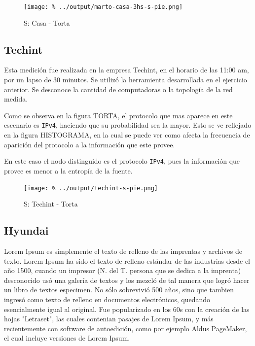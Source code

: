 \documentclass[final,narroweqnarray,inline]{ieee}
\begin{document}
  \begin{figure}[h]\begin{center}
    \texttt{[image: \%
    ../output/marto-casa-3hs-s-pie.png]}
    \vspace{-3em}
    \caption{S: Casa - Torta}
    \label{marto-casa-3hs-s-pie}
  \end{center}\end{figure}

  \subsection{Techint}

  Esta medición fue realizada en la empresa Techint, en el horario de
  las 11:00 am, por un lapso de 30 minutos. Se utilizó la herramienta
  desarrollada en el ejercicio anterior. Se desconoce la cantidad de
  computadoras o la topología de la red medida.
  
  Como se observa en la figura TORTA, el protocolo que mas aparece en
  este escenario es \texttt{IPv4}, haciendo que su probabilidad sea la
  mayor. Esto se ve reflejado en la figura HISTOGRAMA, en la cual se
  puede ver como afecta la frecuencia de aparición del protocolo a la
  información que este provee.

  En este caso el nodo distinguido es el protocolo \texttt{IPv4}, pues
  la información que provee es menor a la entropía de la fuente.

  \begin{figure}[ht]\begin{center}
    \texttt{[image: \%
    ../output/techint-s-pie.png]}
    \vspace{-3em}
    \caption{S: Techint - Torta}
    \label{techint-s-pie}
  \end{center}\end{figure}

  \subsection{Hyundai}

Lorem Ipsum es simplemente el texto de relleno de las imprentas y archivos de texto. Lorem Ipsum ha sido el texto de relleno estándar de las industrias desde el año 1500, cuando un impresor (N. del T. persona que se dedica a la imprenta) desconocido usó una galería de textos y los mezcló de tal manera que logró hacer un libro de textos especimen. No sólo sobrevivió 500 años, sino que tambien ingresó como texto de relleno en documentos electrónicos, quedando esencialmente igual al original. Fue popularizado en los 60s con la creación de las hojas "Letraset", las cuales contenian pasajes de Lorem Ipsum, y más recientemente con software de autoedición, como por ejemplo Aldus PageMaker, el cual incluye versiones de Lorem Ipsum.
\end{document}
